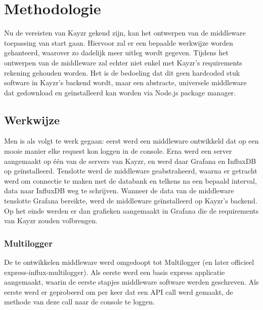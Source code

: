 
\chapter{Methodologie}
\label{ch:methodologie}


Nu de vereisten van Kayzr gekend zijn, kan het ontwerpen van de middleware toepassing van start gaan. Hiervoor zal er een bepaalde werkwijze worden gehanteerd, waarover zo dadelijk meer uitleg wordt gegeven. Tijdens het ontwerpen van de middleware zal echter niet enkel met Kayzr's requirements rekening gehouden worden. Het is de bedoeling dat dit geen hardcoded stuk software in Kayzr's backend wordt, maar een abstracte, universele middleware dat gedownload en geïnstalleerd kan worden via Node.js package manager.  

\section{Werkwijze}
\label{sec:werkwijze}

Men is als volgt te werk gegaan: eerst werd een middleware ontwikkeld dat op een mooie manier elke request kon loggen in de console. Erna werd een server aangemaakt op één van de servers van Kayzr, en werd daar Grafana en InfluxDB op geïnstalleerd. Tenslotte werd de middleware geabstraheerd, waarna er getracht werd om connectie te maken met de databank en telkens na een bepaald interval, data naar InfluxDB weg te schrijven. Wanneer de data van de middleware tenslotte Grafana bereikte, werd de middleware geïnstalleerd op Kayzr's backend. Op het einde werden er dan grafieken aangemaakt in Grafana die de requirements van Kayzr zouden volbrengen. 

\subsection{Multilogger}
\label{sec:multilogger}

De te ontwikkelen middleware werd omgedoopt tot Multilogger (en later officieel express-influx-multilogger). Als eerste werd een basis express applicatie aangemaakt, waarin de eerste stapjes middleware software werden geschreven. Als eerste werd er geprobeerd om per keer dat een API call werd gemaakt, de methode van deze call naar de console te loggen.

